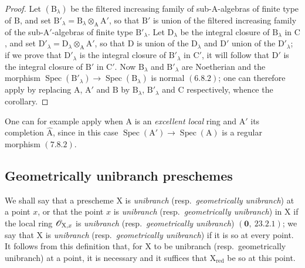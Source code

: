 \begin{proof}
Let $(\mathrm{B}_\lambda)$ be the filtered increasing family of sub-$\mathrm{A}$-algebras of finite type of $\mathrm{B}$, and
set $\mathrm{B}'_\lambda=\mathrm{B}_\lambda\otimes_\mathrm{A}\mathrm{A}'$, so that $\mathrm{B}'$ is union of the filtered increasing family of the
sub-$\mathrm{A}'$-algebras of finite type $\mathrm{B}'_\lambda$. Let $\mathrm{D}_\lambda$ be the integral closure of $\mathrm{B}_\lambda$ in $\mathrm{C}$, and set
$\mathrm{D}'_\lambda=\mathrm{D}_\lambda\otimes_\mathrm{A}\mathrm{A}'$, so that $\mathrm{D}$ is union of the $\mathrm{D}_\lambda$ and $\mathrm{D}'$ union of the $\mathrm{D}'_\lambda$; if we prove
that $\mathrm{D}'_\lambda$ is the integral closure of $\mathrm{B}'_\lambda$ in $\mathrm{C}'$, it will follow that $\mathrm{D}'$ is the integral
closure of $\mathrm{B}'$ in $\mathrm{C}'$. Now $\mathrm{B}_\lambda$ and $\mathrm{B}'_\lambda$ are Noetherian and the morphism $\operatorname{Spec}(\mathrm{B}'_\lambda)\to\operatorname{Spec}(\mathrm{B}_\lambda)$
is normal $(6.8.2)$; one can therefore apply  by replacing $\mathrm{A}$, $\mathrm{A}'$ and $\mathrm{B}$ by $\mathrm{B}_\lambda$,
$\mathrm{B}'_\lambda$ and $\mathrm{C}$ respectively, whence the corollary.
\end{proof}

One can for example apply  when $\mathrm{A}$ is an \emph{excellent local} ring
and $\mathrm{A}'$ its completion $\widehat{\mathrm{A}}$, since in this case $\operatorname{Spec}(\mathrm{A}')\to\operatorname{Spec}(\mathrm{A})$ is a regular
morphism $(7.8.2)$.

\subsection{Geometrically unibranch preschemes}
\label{subsection:IV.6.15}

\begin{env}[6.15.1]
\label{IV.6.15.1}
We shall say that a prescheme $\mathrm{X}$ is \emph{unibranch} (resp.\ \emph{geometrically
unibranch}) at a point $x$, or that the point $x$ is \emph{unibranch} (resp.\ \emph{geometrically unibranch})
in $\mathrm{X}$ if the local ring $\mathscr{O}_{\mathrm{X},x}$ is \emph{unibranch} (resp.\ \emph{geometrically unibranch}) $(\mathbf{0},~23.2.1)$;
we say that $\mathrm{X}$ is \emph{unibranch} (resp.\ \emph{geometrically unibranch}) if it is so at every point. It
follows from this definition that, for $\mathrm{X}$ to be unibranch (resp.\ geometrically
unibranch) at a point, it is necessary and it suffices that $\mathrm{X}_{\mathrm{red}}$ be so at this point.
\end{env}


